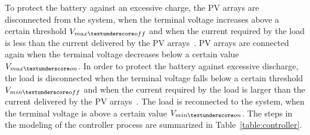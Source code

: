 \documentclass[journal]{IEEEtran}
\begin{document}
To protect the battery against an excessive charge, the PV arrays are disconnected from the system, when the terminal voltage increases above a certain threshold $V_{max \textunderscore off}$ and when the current required by the load is less than the current delivered by the PV arrays~\cite{Hansen}. PV arrays are connected again when the terminal voltage decreases below a certain value $ V_{max \textunderscore on} $. 
%
%
In order to protect the battery against excessive discharge, the load is disconnected when the terminal voltage falls below a certain threshold $V_{min \textunderscore off}$ and when the current required by the load is larger than the current delivered by the PV arrays~\cite{Hansen}. The load is reconnected to the system, when the terminal voltage is above a certain value $V_{min \textunderscore on}$.
%
%
%
The steps in the modeling of the controller process are summarized in Table~\ref{table:controller}.
\end{document}

